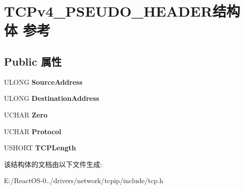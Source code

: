 \hypertarget{struct_t_c_pv4___p_s_e_u_d_o___h_e_a_d_e_r}{}\section{T\+C\+Pv4\+\_\+\+P\+S\+E\+U\+D\+O\+\_\+\+H\+E\+A\+D\+E\+R结构体 参考}
\label{struct_t_c_pv4___p_s_e_u_d_o___h_e_a_d_e_r}
\subsection*{Public 属性}
\begin{DoxyCompactItemize}
\item 
\mbox{\label{struct_t_c_pv4___p_s_e_u_d_o___h_e_a_d_e_r_ac1ff473c89335a21ae5e4a6a8b616717}} 
U\+L\+O\+NG {\bfseries Source\+Address}
\item 
\mbox{\label{struct_t_c_pv4___p_s_e_u_d_o___h_e_a_d_e_r_a6866b98938488e58fb080107cabdfe68}} 
U\+L\+O\+NG {\bfseries Destination\+Address}
\item 
\mbox{\label{struct_t_c_pv4___p_s_e_u_d_o___h_e_a_d_e_r_ac54454adfd364f3ea58d0841895e6810}} 
U\+C\+H\+AR {\bfseries Zero}
\item 
\mbox{\label{struct_t_c_pv4___p_s_e_u_d_o___h_e_a_d_e_r_a1e64807f474d3d5e23d2250c64fbc22d}} 
U\+C\+H\+AR {\bfseries Protocol}
\item 
\mbox{\label{struct_t_c_pv4___p_s_e_u_d_o___h_e_a_d_e_r_adc24bbb6d4dd6d07276248d57df073c8}} 
U\+S\+H\+O\+RT {\bfseries T\+C\+P\+Length}
\end{DoxyCompactItemize}


该结构体的文档由以下文件生成\+:\begin{DoxyCompactItemize}
\item 
E\+:/\+React\+O\+S-\/0../drivers/network/tcpip/include/tcp.\+h\end{DoxyCompactItemize}
